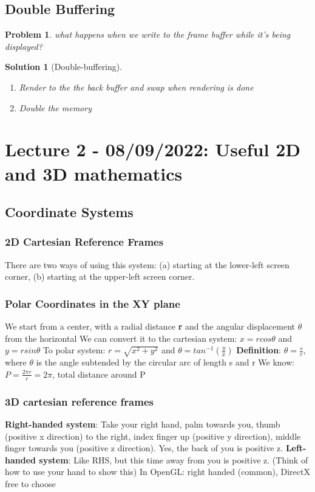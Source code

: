 \documentclass[11pt]{article}
\newtheorem{problem}[theorem]{Problem}
\newtheorem{solution}[theorem]{Solution}
\begin{document}
\subsection{Double Buffering}
\begin{problem}
    what happens when we write to the frame buffer while it's being displayed?
\end{problem}
\begin{solution}[Double-buffering]
    \begin{enumerate}
        \item Render to the the back buffer and swap when rendering is done
        \item Double the memory
    \end{enumerate}
\end{solution}

\section{Lecture 2 - 08/09/2022: Useful 2D and 3D mathematics}
\subsection{Coordinate Systems}
\subsubsection{2D Cartesian Reference Frames}
There are two ways of using this system: (a) starting at the lower-left screen corner, (b) starting at the upper-left screen corner. 

\subsubsection{Polar Coordinates in the XY plane}
We start from a center, with a radial distance \textbf{r} and the angular displacement $\theta$   from the horizontal   
\newline
We can convert it to the cartesian system: $x = r cos \theta$ and $y = r sin \theta$ 
\newline
To polar system: $r = \sqrt{x^2 + y^2}$ and $ \theta = tan^{-1}(\frac{y}{x})$    
\newline
\textbf{Definition}: $\theta = \frac{s}{r}$, where $\theta$ is the angle subtended by the circular arc of length s and r
\newline
We know: $P = \frac{2\pi r}{r} = 2\pi$, total distance around P
\subsubsection{3D cartesian reference frames}
\textbf{Right-handed system}: Take your right hand, palm towards you, thumb (positive x direction) to the right, index finger up (positive y direction), middle finger towards you (positive z direction). Yes, the back of you is positive z.
\newline 
\textbf{Left-handed system}: Like RHS, but this time away from you is positive z. (Think of how to use your hand to show this)
\newline
In OpenGL: right handed (common), DirectX free to choose   
\end{document}
